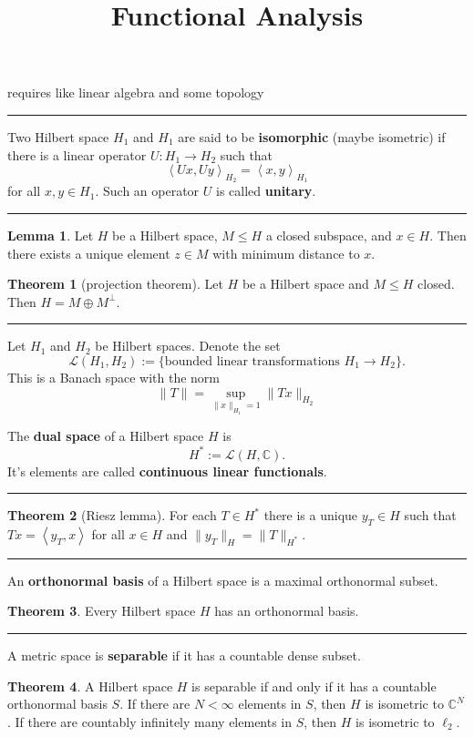 \documentclass[12pt]{article}
\title{Functional Analysis \\
    \large 
}
\author{}
\date{}
\newcommand{\keyword}[1]{\textbf{#1}}
\newcommand{\sepline}{\rule{\textwidth}{0.4pt}}
\theoremstyle{definition}
\newtheorem{theorem}{Theorem}
\newtheorem{lemma}{Lemma}
\newcommand{\C}{\mathbb{C}}
\newcommand{\LL}{\mathcal{L}}
\newcommand{\<}{\left\langle}
\renewcommand{\>}{\right\rangle}
\begin{document}
requires like linear algebra and some topology

\sepline

Two Hilbert space $H_1$ and $H_1$ are said to be \keyword{isomorphic} (maybe isometric) if there is a linear operator $U : H_1 \to H_2$ such that
\[
    \<Ux, Uy\>_{H_2} = \<x, y\>_{H_1}
\]
for all $x, y \in H_1$.
Such an operator $U$ is called \keyword{unitary}.

\sepline

\begin{lemma}
    Let $H$ be a Hilbert space, $M \leq H$ a closed subspace, and $x \in H$.
    Then there exists a unique element $z \in M$ with minimum distance to $x$.
\end{lemma}

\begin{theorem}[projection theorem]
    Let $H$ be a Hilbert space and $M \leq H$ closed.
    Then $H = M \oplus M^\perp$.
\end{theorem}

\sepline

Let $H_1$ and $H_2$ be Hilbert spaces.
Denote the set
\[
    \LL(H_1, H_2) := \{\text{bounded linear transformations } H_1 \to H_2 \}.
\]
This is a Banach space with the norm
\[
    \|T\| = \sup_{\|x\|_{H_1} = 1} \|Tx\|_{H_2}
\]


The \keyword{dual space} of a Hilbert space $H$ is
\[
    H^* := \LL(H, \C).
\]
It's elements are called \keyword{continuous linear functionals}.


\sepline


\begin{theorem}[Riesz lemma]
    For each $T \in H^*$ there is a unique $y_T \in H$ such that $Tx = \<y_T, x\>$ for all $x \in H$ and $\|y_T\|_H = \|T\|_{H^*}$.
\end{theorem}

\sepline

An \keyword{orthonormal basis} of a Hilbert space is a maximal orthonormal subset.

\begin{theorem}
    Every Hilbert space $H$ has an orthonormal basis.
\end{theorem}

\sepline

A metric space is \keyword{separable} if it has a countable dense subset.

\begin{theorem}
    A Hilbert space $H$ is separable if and only if it has a countable orthonormal basis $S$.
    If there are $N < \infty$ elements in $S$, then $H$ is isometric to $\C^N$.
    If there are countably infinitely many elements in $S$, then $H$ is isometric to $\ell_2$.
\end{theorem}
\end{document}
